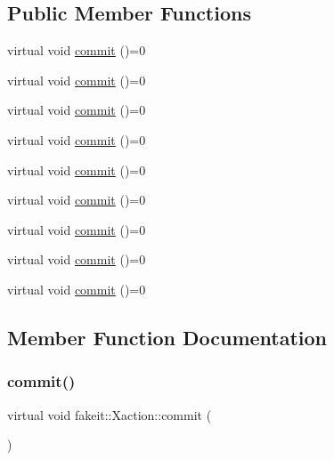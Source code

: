 \subsection*{Public Member Functions}
\begin{DoxyCompactItemize}
\item 
virtual void \mbox{\hyperlink{structfakeit_1_1Xaction_a4822c4b2af0477ae8271a021874224c0}{commit}} ()=0
\item 
virtual void \mbox{\hyperlink{structfakeit_1_1Xaction_a4822c4b2af0477ae8271a021874224c0}{commit}} ()=0
\item 
virtual void \mbox{\hyperlink{structfakeit_1_1Xaction_a4822c4b2af0477ae8271a021874224c0}{commit}} ()=0
\item 
virtual void \mbox{\hyperlink{structfakeit_1_1Xaction_a4822c4b2af0477ae8271a021874224c0}{commit}} ()=0
\item 
virtual void \mbox{\hyperlink{structfakeit_1_1Xaction_a4822c4b2af0477ae8271a021874224c0}{commit}} ()=0
\item 
virtual void \mbox{\hyperlink{structfakeit_1_1Xaction_a4822c4b2af0477ae8271a021874224c0}{commit}} ()=0
\item 
virtual void \mbox{\hyperlink{structfakeit_1_1Xaction_a4822c4b2af0477ae8271a021874224c0}{commit}} ()=0
\item 
virtual void \mbox{\hyperlink{structfakeit_1_1Xaction_a4822c4b2af0477ae8271a021874224c0}{commit}} ()=0
\item 
virtual void \mbox{\hyperlink{structfakeit_1_1Xaction_a4822c4b2af0477ae8271a021874224c0}{commit}} ()=0
\end{DoxyCompactItemize}


\subsection{Member Function Documentation}
\mbox{\label{structfakeit_1_1Xaction_a4822c4b2af0477ae8271a021874224c0}} 
\subsubsection{\texorpdfstring{commit()}{commit()}\hspace{0.1cm}{\footnotesize\ttfamily [1/9]}}
{\footnotesize\ttfamily virtual void fakeit\+::\+Xaction\+::commit (\begin{DoxyParamCaption}{ }\end{DoxyParamCaption})\hspace{0.3cm}{\ttfamily [pure virtual]}}




